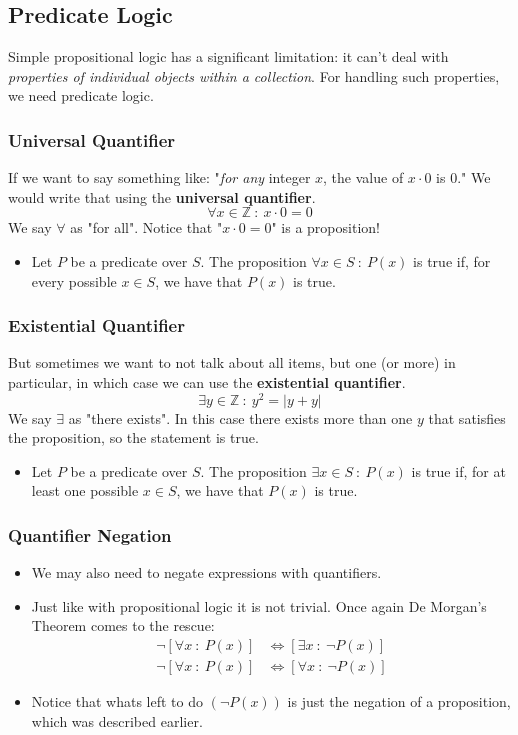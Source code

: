 \documentclass[10pt]{article}
\begin{document}
\subsection*{Predicate Logic}
Simple propositional logic has a significant limitation: it can't deal with \textit{properties of individual objects within a collection}.  For handling such properties, we need predicate logic.

\subsubsection*{Universal Quantifier}
If we want to say something like: "\textit{for any} integer $x$, the value of $x \cdot 0$ is $0$."  We would write that using the \textbf{universal quantifier}.
\[\forall x \in \mathbb{Z}\::\: x \cdot 0 = 0\]
We say $\forall$ as "for all".  Notice that "$x \cdot 0 = 0$" is a proposition!
\begin{itemize}
	\item Let $P$ be a predicate over $S$.  The proposition $\forall x \in S \::\: P(x)$ is true if, for every possible $x \in S$, we have that $P(x)$ is true.
\end{itemize}

\subsubsection*{Existential Quantifier}
But sometimes we want to not talk about all items, but one (or more) in particular, in which case we can use the \textbf{existential quantifier}.
\[\exists y \in \mathbb{Z} \::\: y^2 = \vert y + y \vert\]
We say $\exists$ as "there exists".  In this case there exists more than one $y$ that satisfies the proposition, so the statement is true.
\begin{itemize}
	\item Let $P$ be a predicate over $S$.  The proposition $\exists x \in S\::\: P(x)$ is true if, for at least one possible $x \in S$, we have that $P(x)$ is true.
\end{itemize}

\subsubsection*{Quantifier Negation}
\begin{itemize}
	\item We may also need to negate expressions with quantifiers.
	\item Just like with propositional logic it is not trivial.  Once again De Morgan's Theorem comes to the rescue:
	\begin{align*}
        \neg [\forall x \::\: P(x)] &\Leftrightarrow [\exists x \::\: \neg P(x)]\\
        \neg [\forall x \::\: P(x)] &\Leftrightarrow [\forall x \::\: \neg P(x)]
    \end{align*}
    \item Notice that whats left to do $(\neg P(x))$ is just the negation of a proposition, which was described earlier.
\end{itemize}
\end{document}

